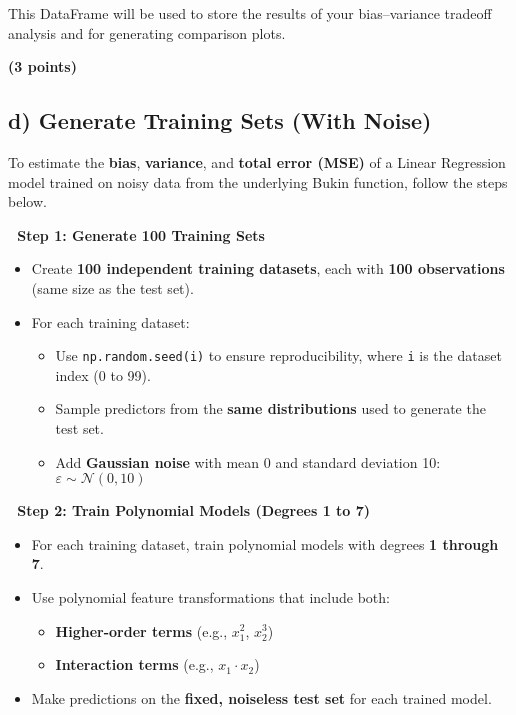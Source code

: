 \documentclass[
  letterpaper,
  DIV=11,
  numbers=noendperiod]{scrreprt}
\providecommand{\tightlist}{%
  \setlength{\itemsep}{0pt}\setlength{\parskip}{0pt}}\usepackage{longtable,booktabs,array}
\begin{document}
This DataFrame will be used to store the results of your bias--variance
tradeoff analysis and for generating comparison plots.

\textbf{(3 points)}

\subsection{d) Generate Training Sets (With
Noise)}\label{d-generate-training-sets-with-noise}

To estimate the \textbf{bias}, \textbf{variance}, and \textbf{total
error (MSE)} of a Linear Regression model trained on noisy data from the
underlying Bukin function, follow the steps below.

\textbf{🔁 Step 1: Generate 100 Training Sets}

\begin{itemize}
\tightlist
\item
  Create \textbf{100 independent training datasets}, each with
  \textbf{100 observations} (same size as the test set).
\item
  For each training dataset:

  \begin{itemize}
  \tightlist
  \item
    Use \texttt{np.random.seed(i)} to ensure reproducibility, where
    \texttt{i} is the dataset index (0 to 99).
  \item
    Sample predictors from the \textbf{same distributions} used to
    generate the test set.
  \item
    Add \textbf{Gaussian noise} with mean 0 and standard deviation 10:\\
    \(\varepsilon \sim \mathcal{N}(0, 10)\)
  \end{itemize}
\end{itemize}

\textbf{🧠 Step 2: Train Polynomial Models (Degrees 1 to 7)}

\begin{itemize}
\tightlist
\item
  For each training dataset, train polynomial models with degrees
  \textbf{1 through 7}.
\item
  Use polynomial feature transformations that include both:

  \begin{itemize}
  \tightlist
  \item
    \textbf{Higher-order terms} (e.g., \(x_1^2\), \(x_2^3\))
  \item
    \textbf{Interaction terms} (e.g., \(x_1 \cdot x_2\))
  \end{itemize}
\item
  Make predictions on the \textbf{fixed, noiseless test set} for each
  trained model.
\end{itemize}
\end{document}
